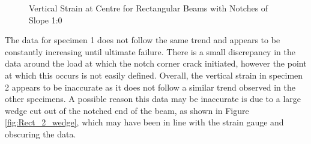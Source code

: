 \documentclass[11pt,a4paper]{article}
\numberwithin{equation}{subsection}
\begin{document}
\begin{figure}[h]
	\begin{center}
	\end{center}
	\caption{Vertical Strain at Centre for Rectangular Beams with Notches of Slope 1:0}
	\label{fig:Rect_10_Y}
\end{figure}
\pagebreak

\noindent
The data for specimen 1 does not follow the same trend and appears to be constantly increasing until ultimate failure. There is a small discrepancy in the data around the load at which the notch corner crack initiated, however the point at which this occurs is not easily defined. Overall, the vertical strain in specimen 2 appears to be inaccurate as it does not follow a similar trend observed in the other specimens. A possible reason this data may be inaccurate is due to a large wedge cut out of the notched end of the beam, as shown in Figure \ref{fig:Rect_2_wedge}, which may have been in line with the strain gauge and obscuring the data. 
\vspace*{\baselineskip}
\end{document}
